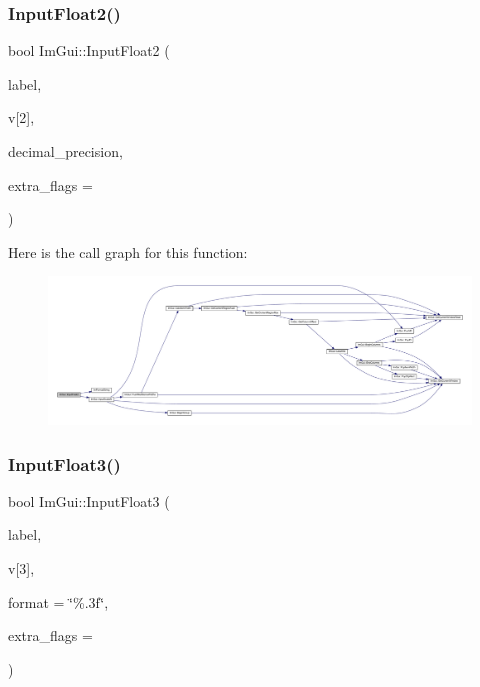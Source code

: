 \subsubsection{\texorpdfstring{Input\+Float2()}{InputFloat2()}\hspace{0.1cm}{\footnotesize\ttfamily [2/2]}}
{\footnotesize\ttfamily bool Im\+Gui\+::\+Input\+Float2 (\begin{DoxyParamCaption}\item[{const char $\ast$}]{label,  }\item[{float}]{v\mbox{[}2\mbox{]},  }\item[{int}]{decimal\+\_\+precision,  }\item[{\mbox{\hyperlink{imgui_8h_a7d2c6153a6b9b5d3178ce82434ac9fb8}{Im\+Gui\+Input\+Text\+Flags}}}]{extra\+\_\+flags = {} }\end{DoxyParamCaption})}

Here is the call graph for this function\+:
\nopagebreak
\begin{figure}[H]
\begin{center}
\leavevmode
\includegraphics[width=350pt]{namespace_im_gui_a320460d1aa6c93f09ef77d6532a013db_cgraph}
\end{center}
\end{figure}
\mbox{\label{namespace_im_gui_a654b614a653848b8fc9a4ad8d1fa4257}} 
\subsubsection{\texorpdfstring{Input\+Float3()}{InputFloat3()}\hspace{0.1cm}{\footnotesize\ttfamily [1/2]}}
{\footnotesize\ttfamily bool Im\+Gui\+::\+Input\+Float3 (\begin{DoxyParamCaption}\item[{const char $\ast$}]{label,  }\item[{float}]{v\mbox{[}3\mbox{]},  }\item[{const char $\ast$}]{format = {\ttfamily \char`\"{}\%.3f\char`\"{}},  }\item[{\mbox{\hyperlink{imgui_8h_a7d2c6153a6b9b5d3178ce82434ac9fb8}{Im\+Gui\+Input\+Text\+Flags}}}]{extra\+\_\+flags = {} }\end{DoxyParamCaption})}

